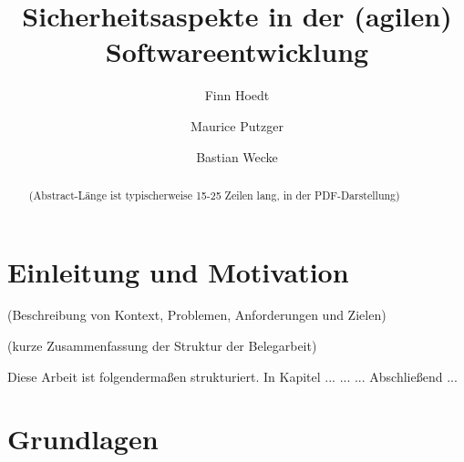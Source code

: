 \documentclass[acmtog]{acmart}
\begin{document}
\title{Sicherheitsaspekte in der (agilen) Softwareentwicklung}

\author{Finn Hoedt}
\author{Maurice Putzger}
\authornotemark[1]
\author{Bastian Wecke}
\authornotemark[1]
\renewcommand{\shortauthors}{Hoedt, Putzger und Wecke}

\begin{abstract}
  (Abstract-Länge ist typischerweise 15-25 Zeilen lang, in der PDF-Darstellung) 
  
  
\end{abstract}

\maketitle

\section{Einleitung und Motivation}

(Beschreibung von Kontext, Problemen, Anforderungen und Zielen) 



(kurze Zusammenfassung der Struktur der Belegarbeit)

Diese Arbeit ist folgendermaßen strukturiert. 
In Kapitel ... 
...
...
Abschließend ...

\section{Grundlagen}
\end{document}
